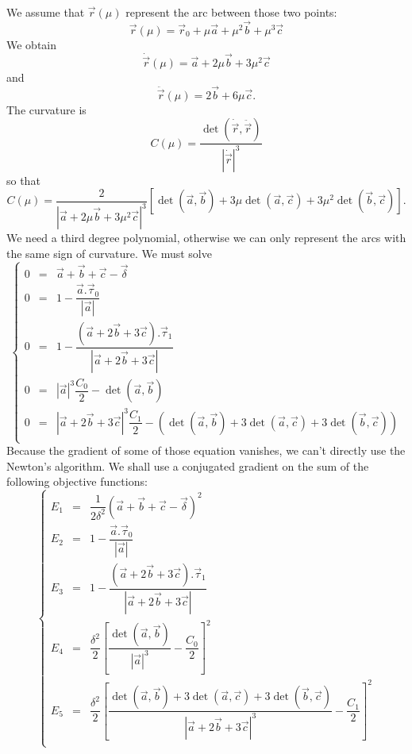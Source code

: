 \documentclass[11pt]{amsart}
\begin{document}
We assume that $\vec{r}(\mu)$ represent the arc between those two points:
\[
	\vec{r}(\mu) = \vec{r}_0 + \mu \vec{a} + \mu^2 \vec{b} + \mu^3 \vec{c}
\]
We obtain
\[
	\dot{\vec{r}}(\mu) = \vec{a} + 2 \mu \vec{b} + 3 \mu^2 \vec{c}
\]
and
\[
	\ddot{\vec{r}}(\mu) = 2\vec{b} + 6 \mu \vec{c}.
\]
The curvature is
\[
	C(\mu) = \dfrac{\det\left(\dot{\vec{r}},\ddot{\vec{r}}\right)}{\left|\dot{\vec{r}}\right|^3}
\]
so that
\[
	C(\mu) = \dfrac{2}{\left|\vec{a} + 2 \mu \vec{b} + 3 \mu^2 \vec{c}\right|^3}
	\left[
	\det\left(\vec{a},\vec{b}\right)
	+3\mu\det\left(\vec{a},\vec{c}\right)
	+3\mu^2\det\left(\vec{b},\vec{c}\right)
	\right].
\]
We need a third degree polynomial, otherwise we can only represent
the arcs with the same sign of curvature.
We must solve
\[
	\left\lbrace
	\begin{array}{rcl}
	0 & = & \vec{a}+\vec{b}+\vec{c} - \vec{\delta}\\
	0 & = & 1 - \dfrac{\vec{a}.\vec{\tau}_0}{\left|\vec{a}\right|}\\
	0 & = & 1 - \dfrac{\left(\vec{a}+2\vec{b}+3\vec{c}\right).\vec{\tau}_1}{\left|\vec{a}+2\vec{b}+3\vec{c}\right|}\\
	0 & = & \left|\vec{a}\right|^3\dfrac{C_0}{2} -\det\left(\vec{a},\vec{b}\right)\\
	0 & = & \left|\vec{a}+2\vec{b}+3\vec{c}\right|^3\dfrac{C_1}{2} -
	 \left( 
	 \det\left(\vec{a},\vec{b}\right)
	 + 3 \det\left(\vec{a},\vec{c}\right)
	 + 3 \det\left(\vec{b},\vec{c}\right)
	 \right)\\
	\end{array}
	\right.
\]
Because the gradient of some of those equation vanishes, we can't directly
use the Newton's algorithm.
We shall use a conjugated gradient on the sum of the following objective functions:
\[
	\left\lbrace
	\begin{array}{rcl}
	E_1 & = & \dfrac{1}{2\delta^2}\left(\vec{a}+\vec{b}+\vec{c} - \vec{\delta}\right)^2\\
	E_2 & = & 1 - \dfrac{\vec{a}.\vec{\tau}_0}{\left|\vec{a}\right|}\\
	E_3 & = & 1 - \dfrac{\left(\vec{a}+2\vec{b}+3\vec{c}\right).\vec{\tau}_1}{\left|\vec{a}+2\vec{b}+3\vec{c}\right|}\\
	E_4 & = & \dfrac{\delta^2}{2}\left[ \dfrac{\det\left(\vec{a},\vec{b}\right)}{\left|\vec{a}\right|^3}-\dfrac{C_0}{2}\right]^2\\
	E_5 & = & \dfrac{\delta^2}{2}\left[
	\dfrac
	{\det\left(\vec{a},\vec{b}\right)
	 + 3 \det\left(\vec{a},\vec{c}\right)
	 + 3 \det\left(\vec{b},\vec{c}\right)}
	{\left|\vec{a}+2\vec{b}+3\vec{c}\right|^3}
	 -\dfrac{C_1}{2}\right]^2\\
	\end{array}
	\right.
\]
\end{document}
